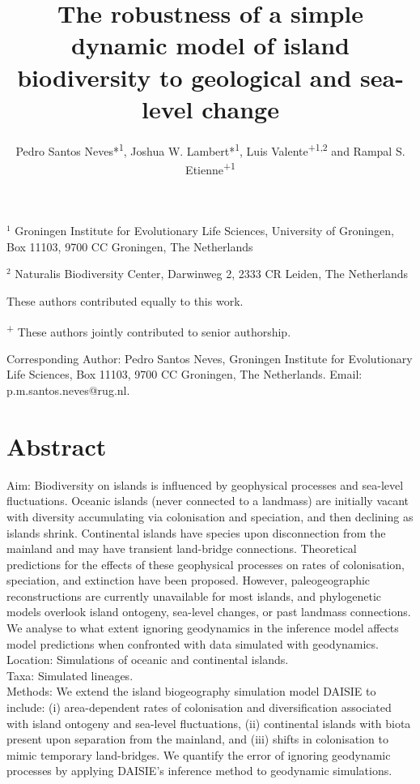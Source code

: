 \documentclass{article}
\title{The robustness of a simple dynamic model of island biodiversity to geological and sea-level change}
\author{Pedro Santos Neves*\textsuperscript{1}, Joshua W. Lambert*\textsuperscript{1}, Luis Valente\textsuperscript{+1,2} and Rampal S. Etienne\textsuperscript{+1}}
\date{}
\begin{document}
\maketitle

\noindent $^{1}$ Groningen Institute for Evolutionary Life Sciences, University of
Groningen, Box 11103, 9700 CC Groningen, The Netherlands

\noindent $^{2}$ Naturalis Biodiversity Center, Darwinweg 2, 2333 CR Leiden, The Netherlands 

\noindent * These authors contributed equally to this work.

\noindent \textsuperscript{+} These authors jointly contributed to senior authorship.

\noindent Corresponding Author: Pedro Santos Neves, Groningen Institute for Evolutionary Life Sciences, Box 11103, 9700 CC Groningen, The Netherlands. Email: p.m.santos.neves@rug.nl.

\section*{Abstract}

Aim: Biodiversity on islands is influenced by geophysical processes and sea-level fluctuations. Oceanic islands (never connected to a landmass) are initially vacant with diversity accumulating via colonisation and speciation, and then declining as islands shrink. Continental islands have species upon disconnection from the mainland and may have transient land-bridge connections. Theoretical predictions for the effects of these geophysical processes on rates of colonisation, speciation, and extinction have been proposed. However, paleogeographic reconstructions are currently unavailable for most islands, and phylogenetic models overlook island ontogeny, sea-level changes, or past landmass connections. We analyse to what extent ignoring geodynamics in the inference model affects model predictions when confronted with data simulated with geodynamics. \\

\noindent Location: Simulations of oceanic and continental islands. \\

\noindent Taxa: Simulated lineages. \\

\noindent Methods: We extend the island biogeography simulation model DAISIE to include: (i) area-dependent rates of colonisation and diversification associated with island ontogeny and sea-level fluctuations, (ii) continental islands with biota present upon separation from the mainland, and (iii) shifts in colonisation to mimic temporary land-bridges. We quantify the error of ignoring geodynamic processes by applying DAISIE’s inference method to geodynamic simulations. \\
\end{document}
